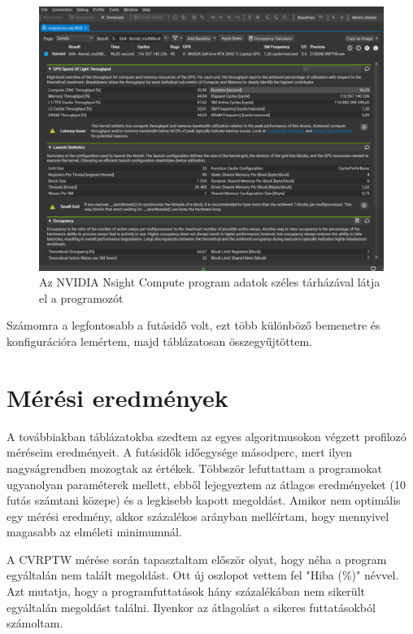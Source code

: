\begin{figure}[ht!]
	\centering
	\includegraphics[width=125mm, keepaspectratio]{figures/nsight-compute2.png}
	\caption{Az NVIDIA Nsight Compute program adatok széles tárházával látja el a programozót }
	\label{fig:nsight-compute}
\end{figure}




Számomra a legfontosabb a futásidő volt, ezt több különböző bemenetre és konfigurációra lemértem, majd táblázatosan összegyűjtöttem.

\section{Mérési eredmények}

A továbbiakban táblázatokba szedtem az egyes algoritmusokon végzett profilozó méréseim eredményeit. A futásidők időegysége másodperc, mert ilyen nagyságrendben mozogtak az értékek. Többször lefuttattam a programokat ugyanolyan paraméterek mellett, ebből lejegyeztem az átlagos eredményeket (10 futás számtani közepe) és a legkisebb kapott megoldást. Amikor nem optimális egy mérési eredmény, akkor százalékos arányban melléírtam, hogy mennyivel magasabb az elméleti minimumnál.

A CVRPTW mérése során tapasztaltam először olyat, hogy néha a program egyáltalán nem talált megoldást. Ott új oszlopot vettem fel "Hiba (\%)" névvel. Azt mutatja, hogy a programfuttatások hány százalékában nem sikerült egyáltalán megoldást találni. Ilyenkor az átlagolást a sikeres futtatásokból számoltam.

\newpage

